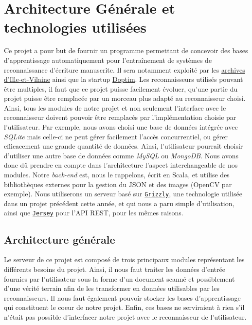 \chapter{Architecture Générale et technologies utilisées}

Ce projet a pour but de fournir un programme permettant de concevoir des bases d'apprentissage automatiquement pour l'entraînement de systèmes de reconnaissance d'écriture manuscrite. Il sera notamment exploité par les \href{http://archives.ille-et-vilaine.fr/fr}{archives d'Ille-et-Vilaine} ainsi que la startup \href{http://www.doptim.eu}{Doptim}. Les reconnaisseurs utilisés pouvant être multiples, il faut que ce projet puisse facilement évoluer, qu'une partie du projet puisse être remplacée par un morceau plus adapté au reconnaisseur choisi. Ainsi, tous les modules de notre projet et non seulement l'interface avec le reconnaisseur doivent pouvoir être remplacés par l'implémentation choisie par l'utilisateur. Par exemple, nous avons choisi une base de données intégrée avec \textit{SQLite} mais celle-ci ne peut gérer facilement l'accès concurrentiel, ou gérer efficacement une grande quantité de données. Ainsi, l'utilisateur pourrait choisir d'utiliser une autre base de données comme \textit{MySQL} ou \textit{MongoDB}. Nous avons donc dû prendre en compte dans l'architecture l'aspect interchangeable de nos modules. Notre \textit{back-end} est, nous le rappelons, écrit en Scala, et utilise des bibliothèques externes pour la gestion du JSON et des images (OpenCV par exemple). Nous utiliserons un serveur basé sur \href{https://javaee.github.io/grizzly}{\texttt{Grizzly}}, une technologie utilisée dans un projet précédent cette année, et qui nous a paru simple d'utilisation, ainsi que \href{https://jersey.github.io}{\texttt{Jersey}} pour l'API REST, pour les mêmes raisons.

\section{Architecture générale}

Le serveur de ce projet est composé de trois principaux modules représentant les différents besoins du projet. Ainsi, il nous faut traiter les données d'entrée fournies par l'utilisateur sous la forme d'un document scanné et possiblement d'une vérité terrain afin de les transformer en données utilisables par les reconnaisseurs. Il nous faut également pouvoir stocker les bases d'apprentissage qui constituent le coeur de notre projet. Enfin, ces bases ne serviraient à rien s'il n'était pas possible d'interfacer notre projet avec le reconnaisseur de l'utilisateur.

